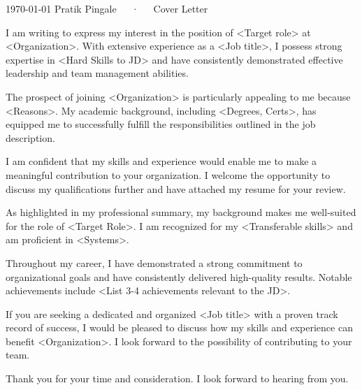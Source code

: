 \documentclass[11pt, a4paper]{awesome-cv}
\begin{document}
\makecvheader[R]

\makecvfooter
  {\today}
  {Pratik Pingale~~~·~~~Cover Letter}
  {}

\makelettertitle

\begin{cvletter}


I am writing to express my interest in the position of <Target role> at <Organization>. With extensive experience as a <Job title>, I possess strong expertise in <Hard Skills to JD> and have consistently demonstrated effective leadership and team management abilities.

The prospect of joining <Organization> is particularly appealing to me because <Reasons>. My academic background, including <Degrees, Certs>, has equipped me to successfully fulfill the responsibilities outlined in the job description.

I am confident that my skills and experience would enable me to make a meaningful contribution to your organization. I welcome the opportunity to discuss my qualifications further and have attached my resume for your review.

As highlighted in my professional summary, my background makes me well-suited for the role of <Target Role>. I am recognized for my <Transferable skills> and am proficient in <Systems>.

Throughout my career, I have demonstrated a strong commitment to organizational goals and have consistently delivered high-quality results. Notable achievements include <List 3-4 achievements relevant to the JD>.

If you are seeking a dedicated and organized <Job title> with a proven track record of success, I would be pleased to discuss how my skills and experience can benefit <Organization>. I look forward to the possibility of contributing to your team.

Thank you for your time and consideration. I look forward to hearing from you.

\end{cvletter}


\makeletterclosing
\end{document}
